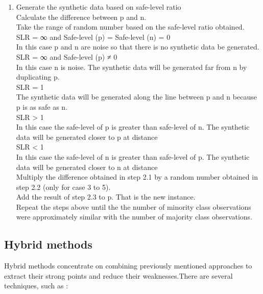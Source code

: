 \begin{enumerate}
\item{Generate the synthetic data based on safe-level ratio \noindent \\
        \indent{} Calculate the difference between p and n. \noindent \\
       \indent{} Take the range of random number based on the safe-level ratio obtained. \noindent \\
                        SLR = ∞ and Safe-level (p) = Safe-level (n) = 0 \noindent \\
                            In this case p and n are noise so that there is no synthetic data be generated. \noindent \\
                        SLR = ∞ and Safe-level (p) ≠ 0 \noindent \\
                            In this case n is noise. The synthetic data will be generated far from n by duplicating p. \noindent \\
                        SLR = 1 \noindent \\
                            The synthetic data will be generated along the line between p and n because p is as safe as n. \noindent \\
                        SLR > 1 \noindent \\
                            In this case the safe-level of p is greater than safe-level of n. The synthetic data will be generated closer to p at distance \noindent \\
                        SLR < 1 \noindent \\
                            In this case the safe-level of n is greater than safe-level of p. The synthetic data will be generated closer to n at distance \noindent \\
     \indent{} Multiply the difference obtained in step 2.1 by a random number obtained in step 2.2 (only for case 3 to 5).\\ 
     \indent{} Add the result of step 2.3 to p. That is the new instance. \noindent \\
      \indent{} Repeat the steps above until the the number of minority class observations were approximately similar with the number of majority class observations. \noindent \\}
\end{enumerate}
\subsection{Hybrid methods}
Hybrid methods concentrate on combining previously mentioned approaches to extract their strong points and reduce their weaknesses.There are several techniques, such as :\noindent \\

